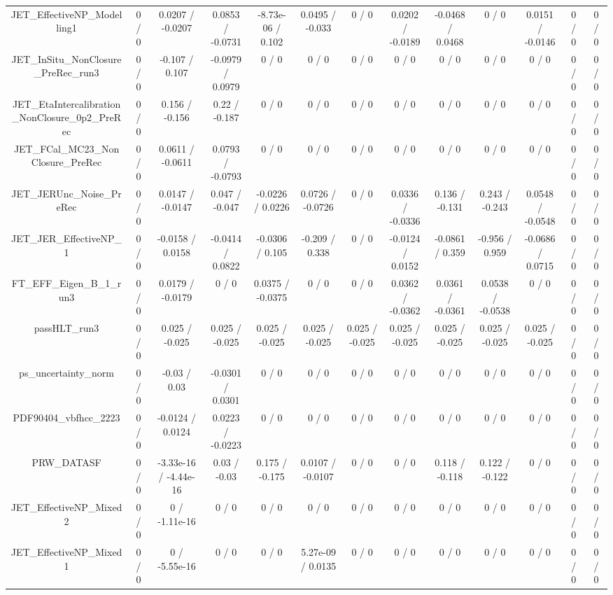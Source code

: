 \documentclass[10pt]{article}
\begin{document}
\begin{table}[htbp]
\begin{center}
\begin{tabular}{|c|c|c|c|c|c|c|c|c|c|c|c|c|}
  JET_EffectiveNP_Modelling1 & 0 / 0 & 0.0207 / -0.0207 & 0.0853 / -0.0731 & -8.73e-06 / 0.102 & 0.0495 / -0.033 & 0 / 0 & 0.0202 / -0.0189 & -0.0468 / 0.0468 & 0 / 0 & 0.0151 / -0.0146 & 0 / 0 & 0 / 0 \\ 
  JET_InSitu_NonClosure_PreRec_run3 & 0 / 0 & -0.107 / 0.107 & -0.0979 / 0.0979 & 0 / 0 & 0 / 0 & 0 / 0 & 0 / 0 & 0 / 0 & 0 / 0 & 0 / 0 & 0 / 0 & 0 / 0 \\ 
  JET_EtaIntercalibration_NonClosure_0p2_PreRec & 0 / 0 & 0.156 / -0.156 & 0.22 / -0.187 & 0 / 0 & 0 / 0 & 0 / 0 & 0 / 0 & 0 / 0 & 0 / 0 & 0 / 0 & 0 / 0 & 0 / 0 \\ 
  JET_FCal_MC23_NonClosure_PreRec & 0 / 0 & 0.0611 / -0.0611 & 0.0793 / -0.0793 & 0 / 0 & 0 / 0 & 0 / 0 & 0 / 0 & 0 / 0 & 0 / 0 & 0 / 0 & 0 / 0 & 0 / 0 \\ 
  JET_JERUnc_Noise_PreRec & 0 / 0 & 0.0147 / -0.0147 & 0.047 / -0.047 & -0.0226 / 0.0226 & 0.0726 / -0.0726 & 0 / 0 & 0.0336 / -0.0336 & 0.136 / -0.131 & 0.243 / -0.243 & 0.0548 / -0.0548 & 0 / 0 & 0 / 0 \\ 
  JET_JER_EffectiveNP_1 & 0 / 0 & -0.0158 / 0.0158 & -0.0414 / 0.0822 & -0.0306 / 0.105 & -0.209 / 0.338 & 0 / 0 & -0.0124 / 0.0152 & -0.0861 / 0.359 & -0.956 / 0.959 & -0.0686 / 0.0715 & 0 / 0 & 0 / 0 \\ 
  FT_EFF_Eigen_B_1_run3 & 0 / 0 & 0.0179 / -0.0179 & 0 / 0 & 0.0375 / -0.0375 & 0 / 0 & 0 / 0 & 0.0362 / -0.0362 & 0.0361 / -0.0361 & 0.0538 / -0.0538 & 0 / 0 & 0 / 0 & 0 / 0 \\ 
  passHLT_run3 & 0 / 0 & 0.025 / -0.025 & 0.025 / -0.025 & 0.025 / -0.025 & 0.025 / -0.025 & 0.025 / -0.025 & 0.025 / -0.025 & 0.025 / -0.025 & 0.025 / -0.025 & 0.025 / -0.025 & 0 / 0 & 0 / 0 \\ 
  ps_uncertainty_norm & 0 / 0 & -0.03 / 0.03 & -0.0301 / 0.0301 & 0 / 0 & 0 / 0 & 0 / 0 & 0 / 0 & 0 / 0 & 0 / 0 & 0 / 0 & 0 / 0 & 0 / 0 \\ 
  PDF90404_vbfhcc_2223 & 0 / 0 & -0.0124 / 0.0124 & 0.0223 / -0.0223 & 0 / 0 & 0 / 0 & 0 / 0 & 0 / 0 & 0 / 0 & 0 / 0 & 0 / 0 & 0 / 0 & 0 / 0 \\ 
  PRW_DATASF & 0 / 0 & -3.33e-16 / -4.44e-16 & 0.03 / -0.03 & 0.175 / -0.175 & 0.0107 / -0.0107 & 0 / 0 & 0 / 0 & 0.118 / -0.118 & 0.122 / -0.122 & 0 / 0 & 0 / 0 & 0 / 0 \\ 
  JET_EffectiveNP_Mixed2 & 0 / 0 & 0 / -1.11e-16 & 0 / 0 & 0 / 0 & 0 / 0 & 0 / 0 & 0 / 0 & 0 / 0 & 0 / 0 & 0 / 0 & 0 / 0 & 0 / 0 \\ 
  JET_EffectiveNP_Mixed1 & 0 / 0 & 0 / -5.55e-16 & 0 / 0 & 0 / 0 & 5.27e-09 / 0.0135 & 0 / 0 & 0 / 0 & 0 / 0 & 0 / 0 & 0 / 0 & 0 / 0 & 0 / 0 \\ 

\end{tabular}
\end{center}
\end{table}
\end{document}
